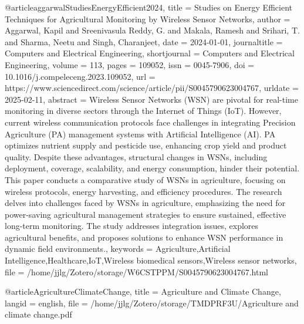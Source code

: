 @article{aggarwalStudiesEnergyEfficient2024,
  title = {Studies on Energy Efficient Techniques for Agricultural Monitoring by Wireless Sensor Networks},
  author = {Aggarwal, Kapil and Sreenivasula Reddy, G. and Makala, Ramesh and Srihari, T. and Sharma, Neetu and Singh, Charanjeet},
  date = {2024-01-01},
  journaltitle = {Computers and Electrical Engineering},
  shortjournal = {Computers and Electrical Engineering},
  volume = {113},
  pages = {109052},
  issn = {0045-7906},
  doi = {10.1016/j.compeleceng.2023.109052},
  url = {https://www.sciencedirect.com/science/article/pii/S0045790623004767},
  urldate = {2025-02-11},
  abstract = {Wireless Sensor Networks (WSN) are pivotal for real-time monitoring in diverse sectors through the Internet of Things (IoT). However, current wireless communication protocols face challenges in integrating Precision Agriculture (PA) management systems with Artificial Intelligence (AI). PA optimizes nutrient supply and pesticide use, enhancing crop yield and product quality. Despite these advantages, structural changes in WSNs, including deployment, coverage, scalability, and energy consumption, hinder their potential. This paper conducts a comparative study of WSNs in agriculture, focusing on wireless protocols, energy harvesting, and efficiency procedures. The research delves into challenges faced by WSNs in agriculture, emphasizing the need for power-saving agricultural management strategies to ensure sustained, effective long-term monitoring. The study addresses integration issues, explores agricultural benefits, and proposes solutions to enhance WSN performance in dynamic field environments.},
  keywords = {Agriculture,Artificial Intelligence,Healthcare,IoT,Wireless biomedical sensors,Wireless sensor networks},
  file = {/home/jjlg/Zotero/storage/W6CSTPPM/S0045790623004767.html}
}

@article{AgricultureClimateChange,
  title = {Agriculture and Climate Change},
  langid = {english},
  file = {/home/jjlg/Zotero/storage/TMDPRF3U/Agriculture and climate change.pdf}
}


